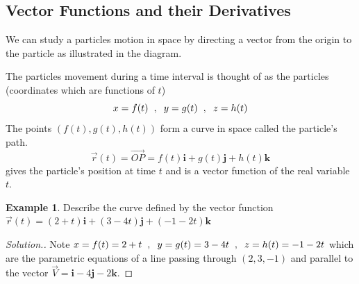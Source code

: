 \documentclass[11pt,a4paper]{article}
\theoremstyle{definition}
\newtheorem{exa}[thm]{Example}
\newenvironment{solution}
  {\renewcommand{\qedsymbol}{}\begin{proof}[\textit{Solution}.]}
  {\end{proof}}
\begin{document}
\subsection{Vector Functions and their Derivatives}
We can study a particles motion in space by directing a vector from the origin to the particle as illustrated in the diagram.


\begin{figure}[H]
\centering
{}
\end{figure}

The particles movement during a time interval is thought of as the particles (coordinates which are functions of $t$)
$$x = f(t) \hspace{0.2cm} , \hspace{0.2cm} y = g(t) \hspace{0.2cm} , \hspace{0.2cm} z = h(t)$$
The points $(f(t), g(t), h(t))$ form a curve in space called the particle's path. $$\overrightarrow{r}(t) = \overrightarrow{OP} = f(t) \textbf{i} + g(t) \textbf{j} + h(t) \textbf{k}$$ gives the particle's position at time $t$ and is a vector function of the real variable $t$.


\begin{exa}


Describe the curve defined by the vector function \hspace{0.2cm}$\overrightarrow{r}(t) = (2 + t)\textbf{i} + (3 - 4t)\textbf{j} + ( -1 -2t)\textbf{k}$
\end{exa}


\begin{solution}


Note $x = f(t) = 2 + t \hspace{0.2cm} , \hspace{0.2cm} y = g(t) = 3 - 4t \hspace{0.2cm} , \hspace{0.2cm} z = h(t) = -1 -2t$ which are the parametric equations of a line passing through $(2,3,-1)$ and parallel to the vector $\overrightarrow{V} = \textbf{i} - 4\textbf{j} - 2\textbf{k}$.
\end{solution}
\end{document}
